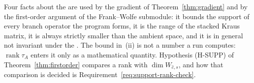 
Four facts about the  are used by the gradient
of Theorem~\ref{thm:gradient} and by the first-order argument of the
Frank--Wolfe submodule: it bounds the support of every branch operator the
program forms, it is the range of the stacked Kraus matrix, it is always
strictly smaller than the ambient space, and it is in general not invariant
under the . The bound in~(ii) is not a number a run computes:
$\operatorname{rank}\tau_A$ enters it only as a mathematical quantity.
Hypothesis (H-SUPP) of Theorem~\ref{thm:firstorder} compares a rank with
$\dim W_{\hat c,s}$, and how that comparison is decided is
Requirement~\ref{req:support-rank-check}.

